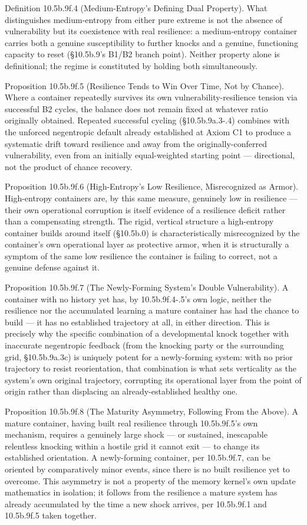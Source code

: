 \documentclass[
]{article}
\begin{document}
Definition 10.5b.9f.4 (Medium-Entropy's Defining Dual Property). What
distinguishes medium-entropy from either pure extreme is not the absence
of vulnerability but its coexistence with real resilience: a
medium-entropy container carries both a genuine susceptibility to
further knocks and a genuine, functioning capacity to reset (§10.5b.9's
B1/B2 branch point). Neither property alone is definitional; the regime
is constituted by holding both simultaneously.

Proposition 10.5b.9f.5 (Resilience Tends to Win Over Time, Not by
Chance). Where a container repeatedly survives its own
vulnerability-resilience tension via successful B2 cycles, the balance
does not remain fixed at whatever ratio originally obtained. Repeated
successful cycling (§10.5b.9a.3-.4) combines with the unforced
negentropic default already established at Axiom C1 to produce a
systematic drift toward resilience and away from the
originally-conferred vulnerability, even from an initially
equal-weighted starting point --- directional, not the product of chance
recovery.

Proposition 10.5b.9f.6 (High-Entropy's Low Resilience, Misrecognized as
Armor). High-entropy containers are, by this same measure, genuinely low
in resilience --- their own operational corruption is itself evidence of
a resilience deficit rather than a compensating strength. The rigid,
vertical structure a high-entropy container builds around itself
(§10.5b.0) is characteristically misrecognized by the container's own
operational layer as protective armor, when it is structurally a symptom
of the same low resilience the container is failing to correct, not a
genuine defense against it.

Proposition 10.5b.9f.7 (The Newly-Forming System's Double
Vulnerability). A container with no history yet has, by 10.5b.9f.4-.5's
own logic, neither the resilience nor the accumulated learning a mature
container has had the chance to build --- it has no established
trajectory at all, in either direction. This is precisely why the
specific combination of a developmental knock together with inaccurate
negentropic feedback (from the knocking party or the surrounding grid,
§10.5b.9a.3c) is uniquely potent for a newly-forming system: with no
prior trajectory to resist reorientation, that combination is what sets
verticality as the system's own original trajectory, corrupting its
operational layer from the point of origin rather than displacing an
already-established healthy one.

Proposition 10.5b.9f.8 (The Maturity Asymmetry, Following From the
Above). A mature container, having built real resilience through
10.5b.9f.5's own mechanism, requires a genuinely large shock --- or
sustained, inescapable relentless knocking within a hostile grid it
cannot exit --- to change its established orientation. A newly-forming
container, per 10.5b.9f.7, can be oriented by comparatively minor
events, since there is no built resilience yet to overcome. This
asymmetry is not a property of the memory kernel's own update
mathematics in isolation; it follows from the resilience a mature system
has already accumulated by the time a new shock arrives, per 10.5b.9f.1
and 10.5b.9f.5 taken together.
\end{document}
